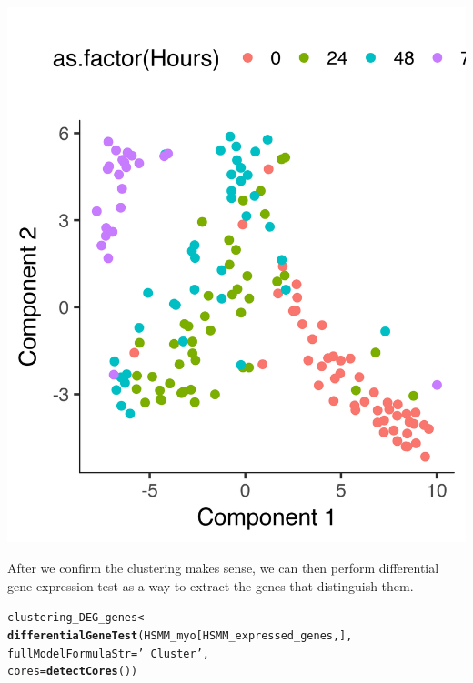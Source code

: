 \documentclass[10pt,oneside]{article}\usepackage[]{graphicx}\usepackage[]{color}
\makeatletter
\def\maxwidth{ %
  \ifdim\Gin@nat@width>\linewidth
    \linewidth
  \else
    \Gin@nat@width
  \fi
}
\newcommand{\hlstr}[1]{\textcolor[rgb]{0.192,0.494,0.8}{#1}}%
\newcommand{\hlstd}[1]{\textcolor[rgb]{0.345,0.345,0.345}{#1}}%
\newcommand{\hlkwb}[1]{\textcolor[rgb]{0.69,0.353,0.396}{#1}}%
\newcommand{\hlkwc}[1]{\textcolor[rgb]{0.333,0.667,0.333}{#1}}%
\newcommand{\hlkwd}[1]{\textcolor[rgb]{0.737,0.353,0.396}{\textbf{#1}}}%
\newenvironment{kframe}{%
 \def\at@end@of@kframe{}%
 \ifinner\ifhmode%
  \def\at@end@of@kframe{\end{minipage}}%
  \begin{minipage}{\columnwidth}%
 \fi\fi%
 \def\FrameCommand##1{\hskip\@totalleftmargin \hskip-\fboxsep
 \colorbox{shadecolor}{##1}\hskip-\fboxsep
     \hskip-\linewidth \hskip-\@totalleftmargin \hskip\columnwidth}%
 \MakeFramed {\advance\hsize-\width
   \@totalleftmargin\z@ \linewidth\hsize
   \@setminipage}}%
 {\par\unskip\endMakeFramed%
 \at@end@of@kframe}
\newenvironment{knitrout}{}{} %
\makeatother
\begin{document}
\begin{knitrout}
\includegraphics[width=\maxwidth]{figure/check_clustering_again-2} 

\end{knitrout}

After we confirm the clustering makes sense, we can then perform differential 
gene expression test as a way to extract the genes that distinguish them. 
\begin{knitrout}
\color{fgcolor}\begin{kframe}
\begin{alltt}
\hlstd{clustering_DEG_genes} \hlkwb{<-} \hlkwd{differentialGeneTest}\hlstd{(HSMM_myo[HSMM_expressed_genes,],}
                                             \hlkwc{fullModelFormulaStr} \hlstd{=} \hlstr{'~Cluster'}\hlstd{,}
                                             \hlkwc{cores} \hlstd{=} \hlkwd{detectCores}\hlstd{())}
\end{alltt}
\end{kframe}
\end{knitrout}
\end{document}

